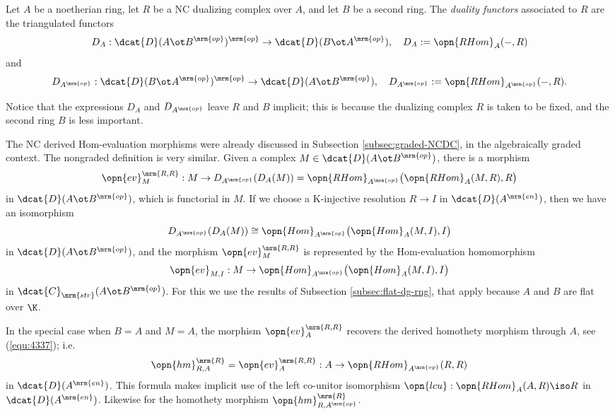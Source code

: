 \begin{dfn} \label{dfn:3680}
Let $A$ be a noetherian ring, let $R$ be a NC dualizing complex over $A$, and 
let $B$ be a second ring. 
The {\em duality functors} 
associated to $R$ are the triangulated functors 
\[ D_A : \dcat{D}(A \ot B^{\mrm{op}})^{\mrm{op}} \to 
\dcat{D}(B \ot A^{\mrm{op}}), \quad 
D_A := \opn{RHom}_A(-, R)   \]
and 
\[ D_{A^{\mrm{op}}} : \dcat{D}(B \ot A^{\mrm{op}})^{\mrm{op}} 
\to \dcat{D}(A \ot B^{\mrm{op}}), \quad 
D_{A^{\mrm{op}}} := \opn{RHom}_{A^{\mrm{op}}}(-, R) .  \]
\end{dfn}

Notice that the expressions $D_A$ and $D_{A^{\mrm{op}}}$ leave $R$ and $B$ 
implicit; this is because the dualizing complex $R$ is taken to be fixed, and 
the second ring $B$ is less important. 

The NC derived Hom-evaluation morphisms were already discussed in Subsection 
\ref{subsec:graded-NCDC}, in the algebraically graded context. The nongraded 
definition is very similar. Given a complex 
$M \in \dcat{D}(A \ot B^{\mrm{op}})$, there is a morphism 
\begin{equation} \label{equ:4335}
\opn{ev}^{\mrm{R, R}}_{M} : M \to D_{A^{\mrm{op}}}(D_{A}(M)) = 
\opn{RHom}_{A^{\mrm{op}}} \bigl( \opn{RHom}_{A}(M, R), R \bigr)
\end{equation}
in $\dcat{D}(A \ot B^{\mrm{op}})$, which is functorial in $M$. If we choose a 
K-injective resolution $R \to I$ in $\dcat{D}(A^{\mrm{en}})$, then we have an 
isomorphism 
\[ D_{A^{\mrm{op}}}(D_{A}(M)) \cong 
\opn{Hom}_{A^\mrm{op}} \bigl( \opn{Hom}_{A}(M, I), I \bigr) \]
in $\dcat{D}(A \ot B^{\mrm{op}})$, and the morphism 
$\opn{ev}^{\mrm{R, R}}_{M}$ is represented by the Hom-evaluation homomorphism
\[ \opn{ev}_{M, I} : M \to 
\opn{Hom}_{A^\mrm{op}} \bigl( \opn{Hom}_{A}(M, I), I \bigr)  \]
in $\dcat{C}_{\mrm{str}}(A \ot B^{\mrm{op}})$. 
For this we use the results of Subsection \ref{subsec:flat-dg-rng}, that apply 
because $A$ and $B$ are flat over $\K$. 

In the special case when $B = A$ and $M = A$, the morphism 
$\opn{ev}^{\mrm{R, R}}_{A}$ recovers the derived 
homothety morphism through $A$, see (\ref{equ:4337}); i.e.\ 
\begin{equation} \label{eqn:4356}
\opn{hm}^{\mrm{R}}_{R, A} = \opn{ev}^{\mrm{R, R}}_{A} : 
A \to \opn{RHom}_{A^{\mrm{op}}}(R, R)
\end{equation}
in $\dcat{D}(A^{\mrm{en}})$. 
This formula makes implicit use of the left co-unitor isomorphism
$\opn{lcu} : \opn{RHom}_{A}(A, R) \iso R$ 
in $\dcat{D}(A^{\mrm{en}})$. 
Likewise for the homothety morphism $\opn{hm}^{\mrm{R}}_{R, A^{\mrm{op}}}$.

